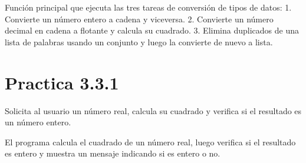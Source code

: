 \documentclass[letterpaper,10pt,spanish]{sphinxmanual}
\begin{document}

\begin{fulllineitems}
\label{\detokenize{pr3:pr3.2_2.main}}
\pysigstartsignatures
{}
\pysigstopsignatures
\sphinxAtStartPar
Función principal que ejecuta las tres tareas de conversión de tipos de datos:
1. Convierte un número entero a cadena y viceversa.
2. Convierte un número decimal en cadena a flotante y calcula su cuadrado.
3. Elimina duplicados de una lista de palabras usando un conjunto y luego la convierte de nuevo a lista.

\end{fulllineitems}



\section{Practica 3.3.1}
\label{\detokenize{pr3:module-pr3.3_1}}\label{\detokenize{pr3:practica-3-3-1}}

\begin{fulllineitems}
\label{\detokenize{pr3:pr3.3_1.calcular_cuadrado}}
\pysigstartsignatures
{}
\pysigstopsignatures
\sphinxAtStartPar
Solicita al usuario un número real, calcula su cuadrado y verifica si el resultado es un número entero.

\sphinxAtStartPar
El programa calcula el cuadrado de un número real, luego verifica si el resultado es entero y
muestra un mensaje indicando si es entero o no.

\end{fulllineitems}

\end{document}

